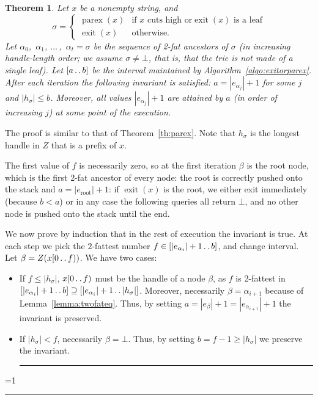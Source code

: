 \documentclass[a4paper]{article}
\newcounter{noqed}
\newcommand{\qed}{ \ifmmode\mbox{
}\fi\rule[-.05em]{.3em}{.7em}\setcounter{noqed}{0}}
\newenvironment{proof}[1][{}]{\noindent{\bf Proof#1.
}\setcounter{noqed}{1}}{\ifnum\value{noqed}=1\qed\fi\par\medskip}
\newtheorem{theorem}{Theorem}
\newcommand{\exit}[1]{\operatorname{exit}(#1)}
\newcommand{\parex}[1]{\operatorname{parex}(#1)}
\newcommand{\?}{\mskip1.5mu}
\def\..{\,\mathpunct{\ldotp\ldotp}} %
\begin{document}
\begin{theorem}
\label{th:exitorparex}
Let $x$ be a nonempty string, and 
\[\sigma=
\begin{cases}
\parex x & \text{if $x$ cuts high or
$\exit x$ is a leaf}\\
\exit x & \text{otherwise.}
\end{cases}
\]
Let 
$\alpha_0$,~$\alpha_1$, $\dots\,$,~${\alpha}_{t}=\sigma$
be the sequence of 2-fat ancestors of $\sigma$ (in increasing handle-length order; we assume $\sigma\neq\bot$, that is, 
that the trie is not made of a single leaf).
Let $[a\..b]$ be the interval maintained by 
  Algorithm~\ref{algo:exitorparex}. After each iteration the following
  invariant is satisfied: $a=|e_{\alpha_j}|+1$ for some $j$ and
  $|h_\sigma|\leq b$. Moreover, all values $|e_{\alpha_j}|+1$ are attained by $a$
  (in order of increasing $j$) at some point of the execution.
\end{theorem}
\begin{proof}
The proof is similar to that of Theorem~\ref{th:parex}.
Note that $h_\sigma$ is the longest handle in $Z$ that is a prefix of
$x$. 

The first value of $f$ is necessarily zero, so at the first iteration
$\beta$ is the root node, which is the first 2-fat ancestor of every node:
the root is correctly pushed onto the stack and $a=|e_{\mathrm{root}}|+1$:
if $\exit x$ is the root, we either exit immediately (because $b<a$) or in any
case the following queries all return $\bot$, and no other node is pushed onto the stack until the
end.

We now prove by induction that in the rest of execution the invariant is true.
At each step we pick the
$2$-fattest number $f\in[|e_{\alpha_i}|+1\..b]$, and change interval. Let
$\beta=Z(x[0\..f))$. We have two cases:
\begin{itemize}
  \item If $f\leq |h_\sigma|$, $x[0\..f)$
  must be the handle of a node $\beta$, as $f$ is
  2-fattest in
  $[|e_{\alpha_i}|+1\..b]\supseteq[|e_{\alpha_i}|+1\..|h_\sigma|]$.
  Moreover, necessarily $\beta=\alpha_{i+1}$ because of Lemma~\ref{lemma:twofateq}. Thus, by setting
  $a=|e_\beta|+1=|e_{\alpha_{i+1}}|+1$ the invariant is preserved.
  \item If $|h_\sigma|<f$, necessarily 
  $\beta=\bot$. Thus, by setting $b=f-1\geq|h_\sigma|$  we
    preserve the invariant.\qed
\end{itemize}
\end{proof}
\end{document}
